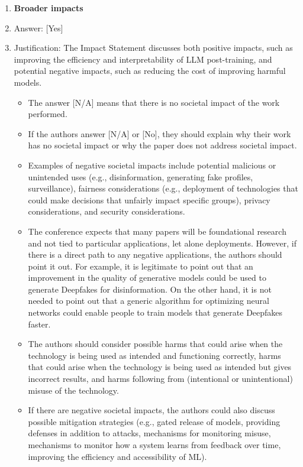 \documentclass{llmxive}
\providecommand{\answerYes}[1][]{[Yes]#1}
\providecommand{\answerNo}[1][]{[No]#1}
\providecommand{\answerNA}[1][]{[N/A]#1}
\begin{document}
\begin{enumerate}
    
\item {\bf Broader impacts}
    \item[] Answer: \answerYes{}
    \item[] Justification: The Impact Statement discusses both positive impacts, such as improving the efficiency and interpretability of LLM post-training, and potential negative impacts, such as reducing the cost of improving harmful models.
    \begin{itemize}
        \item The answer \answerNA{} means that there is no societal impact of the work performed.
        \item If the authors answer \answerNA{} or \answerNo, they should explain why their work has no societal impact or why the paper does not address societal impact.
        \item Examples of negative societal impacts include potential malicious or unintended uses (e.g., disinformation, generating fake profiles, surveillance), fairness considerations (e.g., deployment of technologies that could make decisions that unfairly impact specific groups), privacy considerations, and security considerations.
        \item The conference expects that many papers will be foundational research and not tied to particular applications, let alone deployments. However, if there is a direct path to any negative applications, the authors should point it out. For example, it is legitimate to point out that an improvement in the quality of generative models could be used to generate Deepfakes for disinformation. On the other hand, it is not needed to point out that a generic algorithm for optimizing neural networks could enable people to train models that generate Deepfakes faster.
        \item The authors should consider possible harms that could arise when the technology is being used as intended and functioning correctly, harms that could arise when the technology is being used as intended but gives incorrect results, and harms following from (intentional or unintentional) misuse of the technology.
        \item If there are negative societal impacts, the authors could also discuss possible mitigation strategies (e.g., gated release of models, providing defenses in addition to attacks, mechanisms for monitoring misuse, mechanisms to monitor how a system learns from feedback over time, improving the efficiency and accessibility of ML).
    \end{itemize}


\end{enumerate}
\end{document}
